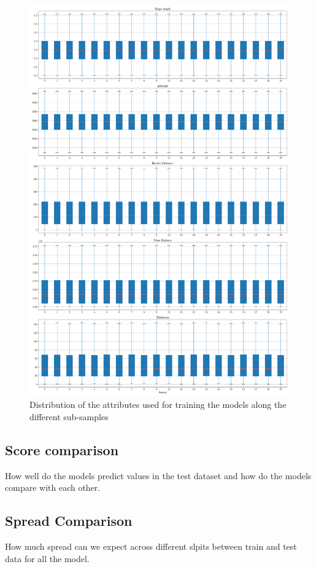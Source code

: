 \begin{figure}[!tp]
	\centering		  
	\includegraphics[width=1.\textwidth]{figures/samples_distribution.pdf}
	\caption{Distribution of the attributes used for training the models along the different sub-samples}
	\label{fig:distribution}
\end{figure}

\subsection{Score comparison}
How well do the models predict values in the test dataset and how do the models compare with each other.

\subsection{Spread Comparison}
How much spread can we expect across different slpits between train and test data for all the model.


